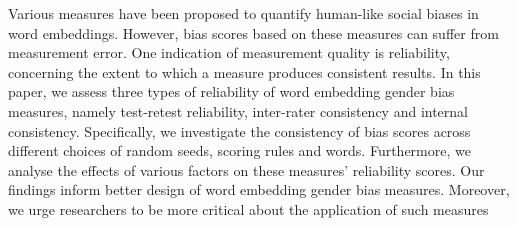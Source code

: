 Various measures have been proposed to quantify human-like social biases in word embeddings. However, bias scores based on these measures can suffer from measurement error. One indication of measurement quality is reliability, concerning the extent to which a measure produces consistent results. In this paper, we assess three types of reliability of word embedding gender bias measures, namely test-retest reliability, inter-rater consistency and internal consistency. Specifically, we investigate the consistency of bias scores across different choices of random seeds, scoring rules and words. Furthermore, we analyse the effects of various factors on these measures' reliability scores. Our findings inform better design of word embedding gender bias measures. Moreover, we urge researchers to be more critical about the application of such measures
